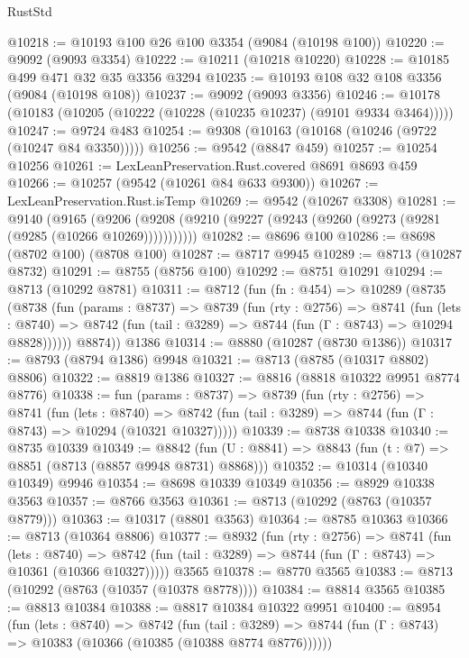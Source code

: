 \begin{lexlean}{RustStd}
\begin{coremodule}
@10218 := @10193 @100 @26 @100 @3354 (@9084 (@10198 @100))
@10220 := @9092 (@9093 @3354)
@10222 := @10211 (@10218 @10220)
@10228 := @10185 @499 @471 @32 @35 @3356 @3294
@10235 := @10193 @108 @32 @108 @3356 (@9084 (@10198 @108))
@10237 := @9092 (@9093 @3356)
@10246 := @10178 (@10183 (@10205 (@10222 (@10228 (@10235 @10237) (@9101 @9334 @3464)))))
@10247 := @9724 @483
@10254 := @9308 (@10163 (@10168 (@10246 (@9722 (@10247 @84 @3350)))))
@10256 := @9542 (@8847 @459)
@10257 := @10254 @10256
@10261 := LexLeanPreservation.Rust.covered @8691 @8693 @459
@10266 := @10257 (@9542 (@10261 @84 @633 @9300))
@10267 := LexLeanPreservation.Rust.isTemp
@10269 := @9542 (@10267 @3308)
@10281 := @9140
    (@9165 (@9206 (@9208 (@9210 (@9227 (@9243 (@9260 (@9273 (@9281 (@9285 (@10266 @10269)))))))))))
@10282 := @8696 @100
@10286 := @8698 (@8702 @100) (@8708 @100)
@10287 := @8717 @9945
@10289 := @8713 (@10287 @8732)
@10291 := @8755 (@8756 @100)
@10292 := @8751 @10291
@10294 := @8713 (@10292 @8781)
@10311 := @8712
    (fun (fn : @454) =>
    @10289
      (@8735
        (@8738
          (fun (params : @8737) =>
          @8739
            (fun (rty : @2756) =>
            @8741
              (fun (lets : @8740) =>
              @8742 (fun (tail : @3289) => @8744 (fun (Γ : @8743) => @10294 @8828))))))
        @8874))
    @1386
@10314 := @8880 (@10287 (@8730 @1386))
@10317 := @8793 (@8794 @1386) @9948
@10321 := @8713 (@8785 (@10317 @8802) @8806)
@10322 := @8819 @1386
@10327 := @8816 (@8818 @10322 @9951 @8774 @8776)
@10338 := fun (params : @8737) =>
  @8739
    (fun (rty : @2756) =>
    @8741
      (fun (lets : @8740) =>
      @8742 (fun (tail : @3289) => @8744 (fun (Γ : @8743) => @10294 (@10321 @10327)))))
@10339 := @8738 @10338
@10340 := @8735 @10339
@10349 := @8842 (fun (U : @8841) => @8843 (fun (t : @7) => @8851 (@8713 (@8857 @9948 @8731) @8868)))
@10352 := @10314 (@10340 @10349) @9946
@10354 := @8698 @10339 @10349
@10356 := @8929 @10338 @3563
@10357 := @8766 @3563
@10361 := @8713 (@10292 (@8763 (@10357 @8779)))
@10363 := @10317 (@8801 @3563)
@10364 := @8785 @10363
@10366 := @8713 (@10364 @8806)
@10377 := @8932
    (fun (rty : @2756) =>
    @8741
      (fun (lets : @8740) =>
      @8742 (fun (tail : @3289) => @8744 (fun (Γ : @8743) => @10361 (@10366 @10327)))))
    @3565
@10378 := @8770 @3565
@10383 := @8713 (@10292 (@8763 (@10357 (@10378 @8778))))
@10384 := @8814 @3565
@10385 := @8813 @10384
@10388 := @8817 @10384 @10322 @9951
@10400 := @8954
    (fun (lets : @8740) =>
    @8742
      (fun (tail : @3289) =>
      @8744 (fun (Γ : @8743) => @10383 (@10366 (@10385 (@10388 @8774 @8776))))))

\end{coremodule}
\end{lexlean}
